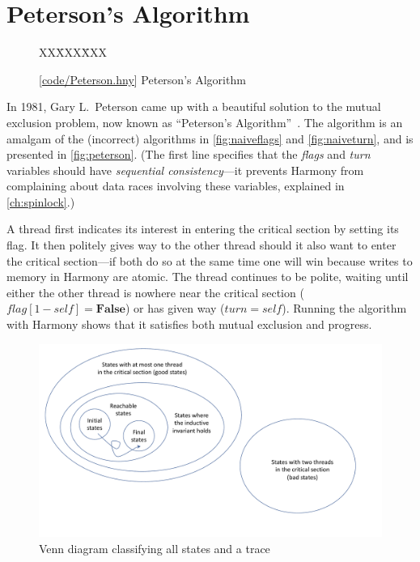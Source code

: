 \documentclass{report}
\newcommand{\harmonysource}[1]{
\begin{tabbing}
XX\=XXX\=XXX\kill
    
\end{tabbing}
}
\newcommand{\harmonylink}[1]{%
[\href{https://harmony.cs.cornell.edu/#1}{\underline{#1}}]%
}
\newenvironment{code}{
\tcolorbox
}{
\endtcolorbox
}
\begin{document}
\chapter{Peterson's Algorithm}
\label{ch:peterson}
%

\begin{figure}
\begin{code}
\harmonysource{Peterson}
\end{code}
\caption{\harmonylink{code/Peterson.hny} Peterson's Algorithm}
\label{fig:peterson}
\end{figure}

%
In 1981, Gary L.~Peterson came up with a beautiful solution to the mutual exclusion
problem, now known as ``Peterson's Algorithm''~\cite{Peterson81}.
The algorithm is an amalgam of the (incorrect) algorithms in
\autoref{fig:naiveflags} and \autoref{fig:naiveturn}, and is presented
in \autoref{fig:peterson}.
(The first line specifies that the \textit{flags} and \textit{turn}
variables should have \emph{sequential consistency}---it prevents
Harmony from complaining about data races involving these variables,
explained in \autoref{ch:spinlock}.)

A thread first indicates its interest in entering the critical section
by setting its flag.
It then politely gives way to the other thread should it also want to
enter the critical section---if both do so at the same time one will
win because writes to memory in Harmony are atomic.
The thread continues to be polite, waiting
until either the other thread is nowhere near the critical section
($\mathit{flag}[1 - \mathit{self}] = \mathbf{False}$) or has given way
($\mathit{turn} = \mathit{self}$).
Running the algorithm with Harmony shows that it satisfies both mutual
exclusion and progress.

\begin{figure}
\begin{center}
\includegraphics[width=6in]{figures/states-crop.pdf}
\end{center}
\caption{Venn diagram classifying all states and a trace}
\label{fig:states}
\end{figure}
\end{document}
